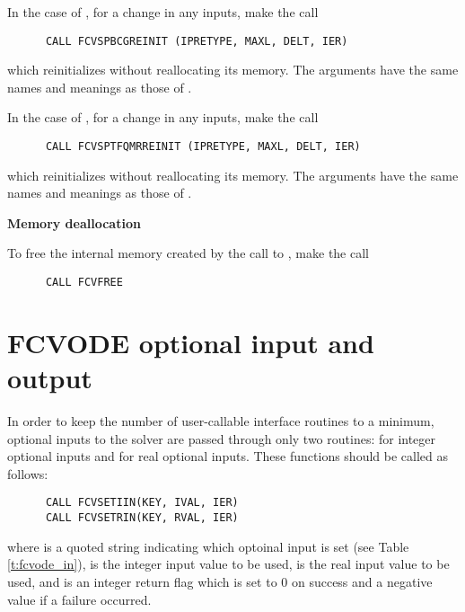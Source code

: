 \begin{Steps}
  In the case of {\spbcg}, for a change in any inputs, make the call
\begin{verbatim}
      CALL FCVSPBCGREINIT (IPRETYPE, MAXL, DELT, IER)
\end{verbatim}
  which reinitializes {\spbcg} without reallocating its memory.
  The arguments have the same names and meanings as those of .

  In the case of {\sptfqmr}, for a change in any inputs, make the call
\begin{verbatim}
      CALL FCVSPTFQMRREINIT (IPRETYPE, MAXL, DELT, IER)
\end{verbatim}
  which reinitializes {\sptfqmr} without reallocating its memory.
  The arguments have the same names and meanings as those of .


\item {\bf Memory deallocation}

  To free the internal memory created by the call to ,
  make the call
\begin{verbatim}
      CALL FCVFREE
\end{verbatim}

\end{Steps}


\section{FCVODE optional input and output}

In order to keep the number of user-callable {\fcvode} interface routines to
a minimum, optional inputs to the {\cvode} solver are passed through only
two routines:  for integer optional inputs and 
for real optional inputs. These functions should be called as follows:
\begin{verbatim}
      CALL FCVSETIIN(KEY, IVAL, IER)
      CALL FCVSETRIN(KEY, RVAL, IER)
\end{verbatim}
where  is a quoted string indicating which optoinal input is set
(see Table \ref{t:fcvode_in}),
 is the integer input value to be used,
 is the real input value to be used, and
 is an integer return flag which is set to $0$ on success and 
a negative value if a failure occurred.


